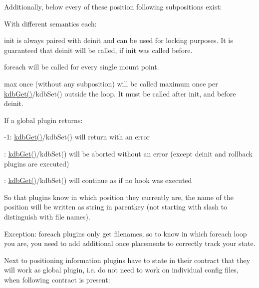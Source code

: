 Additionally, below every of these position following subpositions exist\+:


\begin{DoxyCode}{0}
\end{DoxyCode}


With different semantics each\+:


\begin{DoxyItemize}
\item {\ttfamily init} is always paired with {\ttfamily deinit} and can be used for locking purposes. It is guaranteed that {\ttfamily deinit} will be called, if {\ttfamily init} was called before.
\item {\ttfamily foreach} will be called for every single mount point.
\item {\ttfamily max once} (without any subposition) will be called maximum once per {\ttfamily \mbox{\hyperlink{group__kdb_ga28e385fd9cb7ccfe0b2f1ed2f62453a1}{kdb\+Get()}}/kdb\+Set()} outside the loop. It must be called after {\ttfamily init}, and before {\ttfamily deinit}.
\end{DoxyItemize}

If a global plugin returns\+:


\begin{DoxyItemize}
\item {\ttfamily -\/1}\+: {\ttfamily \mbox{\hyperlink{group__kdb_ga28e385fd9cb7ccfe0b2f1ed2f62453a1}{kdb\+Get()}}/kdb\+Set()} will return with an error
\item {}\+: {\ttfamily \mbox{\hyperlink{group__kdb_ga28e385fd9cb7ccfe0b2f1ed2f62453a1}{kdb\+Get()}}/kdb\+Set()} will be aborted without an error (except {\ttfamily deinit} and {\ttfamily rollback} plugins are executed)
\item {}\+: {\ttfamily \mbox{\hyperlink{group__kdb_ga28e385fd9cb7ccfe0b2f1ed2f62453a1}{kdb\+Get()}}/kdb\+Set()} will continue as if no hook was executed
\end{DoxyItemize}

So that plugins know in which position they currently are, the name of the position will be written as string in parentkey (not starting with slash to distinguish with file names).

Exception\+: {\ttfamily foreach} plugins only get filenames, so to know in which foreach loop you are, you need to add additional {\ttfamily once} placements to correctly track your state.

Next to positioning information plugins have to state in their contract that they will work as global plugin, i.\+e. do not need to work on individual config files, when following contract is present\+:


